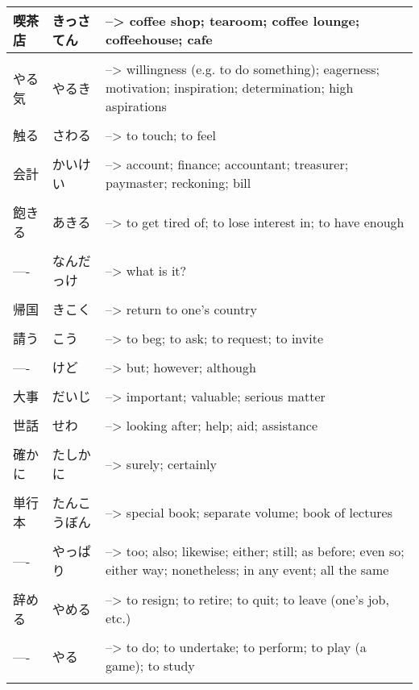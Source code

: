 \documentclass{article}
\begin{document}
\begin{tabular}{ l | l p{14cm}  }
喫茶店 &きっさてん &--> coffee shop; tearoom; coffee lounge; coffeehouse; cafe \\ \hline\\[-1em]
やる気 &やるき &--> willingness (e.g. to do something); eagerness; motivation; inspiration; determination; high aspirations \\ \hline\\[-1em]
触る &さわる &--> to touch; to feel \\ \hline\\[-1em]
会計 &かいけい &--> account; finance; accountant; treasurer; paymaster; reckoning; bill \\ \hline\\[-1em]
飽きる &あきる &--> to get tired of; to lose interest in; to have enough \\ \hline\\[-1em]
---- &なんだっけ &--> what is it? \\ \hline\\[-1em]
帰国 &きこく &--> return to one's country \\ \hline\\[-1em]
請う &こう &--> to beg; to ask; to request; to invite \\ \hline\\[-1em]
---- &けど &--> but; however; although \\ \hline\\[-1em]
大事 &だいじ &--> important; valuable; serious matter \\ \hline\\[-1em]
世話 &せわ &--> looking after; help; aid; assistance \\ \hline\\[-1em]
確かに &たしかに &--> surely; certainly \\ \hline\\[-1em]
単行本 &たんこうぼん &--> special book; separate volume; book of lectures \\ \hline\\[-1em]
---- &やっぱり &--> too; also; likewise; either; still; as before; even so; either way; nonetheless; in any event; all the same \\ \hline\\[-1em]
辞める &やめる &--> to resign; to retire; to quit; to leave (one's job, etc.) \\ \hline\\[-1em]
---- &やる &--> to do; to undertake; to perform; to play (a game); to study \\ \hline\\[-1em]

\end{tabular}
\end{document}

